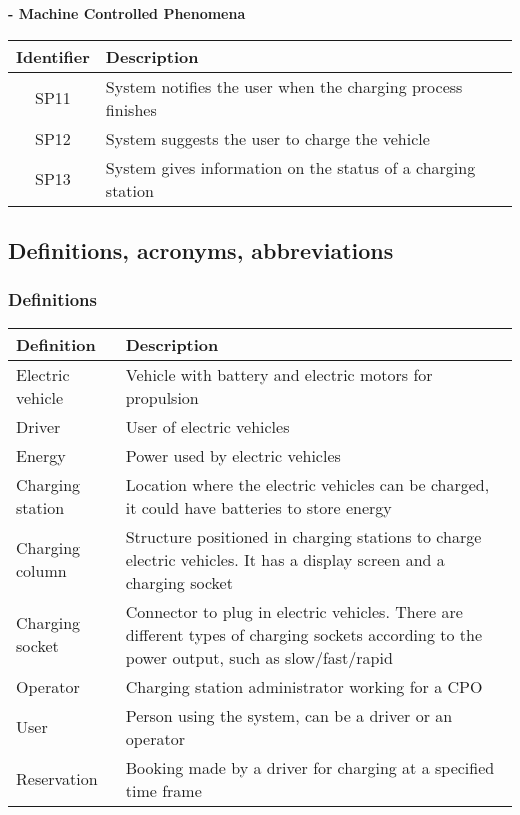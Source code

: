 \documentclass[../main.tex]{subfiles}
\begin{document}
\vspace{-2em}
\textbf{- Machine Controlled Phenomena}
\begin{center}
\begin{tabular}{| c | l |} 
 \hline
 \textbf{Identifier} & \textbf{Description} \\
 \hline
 SP11 & System notifies the user when the charging process finishes \\
 \hline
 SP12 & System suggests the user to charge the vehicle \\
 \hline
 SP13 & System gives information on the status of a charging station \\
 \hline
\end{tabular}
\end{center}




\subsection{Definitions, acronyms, abbreviations}
\subsubsection{Definitions}
\begin{center}
\begin{longtable}{| l | p{10cm} | } 
\hline
\textbf{Definition} & \textbf{Description} \\
\hline
Electric vehicle & Vehicle with battery and electric motors for propulsion \\ 
\hline
Driver & User of electric vehicles \\ 
\hline
Energy & Power used by electric vehicles \\
\hline
Charging station & Location where the electric vehicles can be charged, it could have batteries to store energy \\
\hline
Charging column & Structure positioned in charging stations to charge electric vehicles. It has a display screen and a charging socket \\
\hline
Charging socket & Connector to plug in electric vehicles. There are different types of charging sockets according to the power output, such as slow/fast/rapid \\
\hline
Operator & Charging station administrator working for a CPO \\
\hline
User & Person using the system, can be a driver or an operator \\
\hline
Reservation & Booking made by a driver for charging at a specified time frame \\
\hline
\end{longtable}
\end{center}
\end{document}
